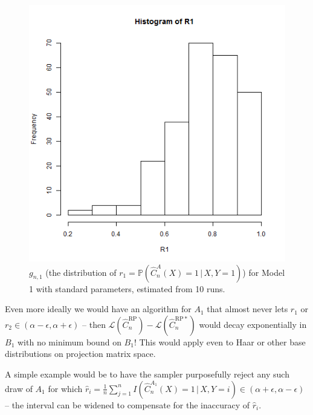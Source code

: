\documentclass[ejs,preprint]{imsart}
\newcommand\crpnhat{\hat{C}_{n}^{\mathrm{RP}}}
\newcommand\crpnhatstar{\hat{C}_{n}^{\mathrm{RP*}}}
\newcommand\risk{\mathcal{L}}
\begin{document}
\begin{figure}
\begin{centering}
\includegraphics[scale=0.5]{r1_dist}
\par\end{centering}

\caption{$g_{n,1}$ (the distribution of $r_{1}=\mathbb{P}\left(\hat{C}_{n}^{A}(X)=1\,|\,X,Y=1\right)$)
for Model 1 with standard parameters, estimated from 10 runs.}


\label{fig:r1-dist}
\end{figure}

Even more ideally we would have an algorithm for $A_{1}$ that almost never lets $r_{1}$ or $r_{2}\in(\alpha-\epsilon,\alpha+\epsilon)$
-- then $\risk\left(\crpnhat\right)-\risk\left(\crpnhatstar\right)$ would decay exponentially in $B_{1}$ with no minimum bound on $B_{1}$! This would apply even to Haar or other base distributions on projection matrix space.

A simple example would be to have the sampler purposefully reject any such draw of $A_1$ for which $\hat r_i = \frac1n\sum_{j=1}^n I(\hat C_n^{A_1}(X)=1 \,|\, X,Y=i) \in (\alpha+\epsilon, \alpha-\epsilon)$ -- the interval can be widened to compensate for the inaccuracy of $\hat r_i$.
\end{document}

